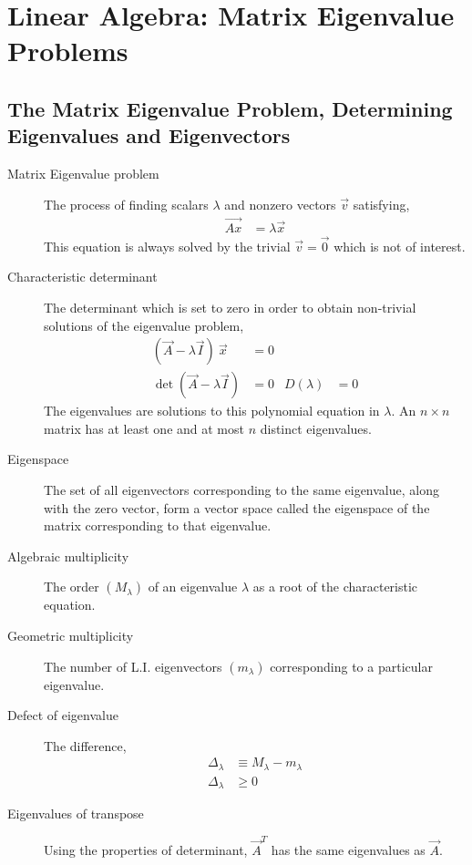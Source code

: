 \chapter{Linear Algebra: Matrix Eigenvalue Problems}
\section{The Matrix Eigenvalue Problem, Determining Eigenvalues and Eigenvectors}

\begin{description}
    \item[Matrix Eigenvalue problem] The process of finding scalars $ \lambda $ and
        nonzero vectors $ \vec{v} $ satisfying,
        \begin{align}
            \vec{Ax} & = \lambda \vec{x}
        \end{align}
        This equation is always solved by the trivial $ \vec{v}  = \vec{0}$ which is
        not of interest.

    \item[Characteristic determinant] The determinant which is set to zero in order to
        obtain non-trivial solutions of the eigenvalue problem,
        \begin{align}
            (\vec{A} - \lambda \vec{I})\ \vec{x} & = 0   \\
            \det(\vec{A} - \lambda \vec{I})      & = 0 &
            D(\lambda)                           & = 0
        \end{align}
        The eigenvalues are solutions to this polynomial equation in $ \lambda $. An
        $ n \times n $ matrix has at least one and at most $ n $ distinct eigenvalues.

    \item[Eigenspace] The set of all eigenvectors corresponding to the same eigenvalue,
        along with the zero vector, form a vector space called the eigenspace of the
        matrix corresponding to that eigenvalue.

    \item[Algebraic multiplicity] The order $ (M_\lambda) $ of an eigenvalue $ \lambda $
        as a root of the characteristic equation.

    \item[Geometric multiplicity] The number of L.I. eigenvectors $ (m_\lambda) $
        corresponding to a particular eigenvalue.

    \item[Defect of eigenvalue] The difference,
        \begin{align}
            \Delta_\lambda & \equiv M_\lambda - m_\lambda \\
            \Delta_\lambda & \geq 0
        \end{align}

    \item[Eigenvalues of transpose] Using the properties of determinant, $ \vec{A}^T $
        has the same eigenvalues as $ \vec{A} $.
\end{description}

